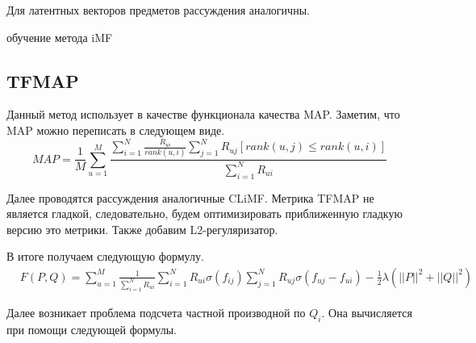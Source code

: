 \documentclass[14pt]{extarticle}
\begin{document}
Для латентных векторов предметов рассуждения аналогичны.

\begin{algorithm}[h]
\caption{обучение метода iMF}
\begin{algorithmic}[1]
\Repeat {} 
	\EndFor
	\EndFor
{}

\end{algorithmic}
\label{alg:climf}
\end{algorithm}


%

\subsection{TFMAP}
Данный метод использует в качестве функционала качества MAP. Заметим, что MAP можно переписать в следующем виде. 
\begin{equation*}
 MAP = \frac{1}{M}\sum_{u=1}^M\frac{\sum_{i=1}^N \frac{R_{ui}}{rank(u, i)} \sum_{j=1}^N R_{uj} 
 [rank(u,j) \leq rank(u, i)]}{\sum_{i=1}^N R_{ui}} 
\end{equation*} 
 
 Далее проводятся рассуждения аналогичные CLiMF. Метрика TFMAP  не является гладкой, следовательно, будем оптимизировать приближенную гладкую версию это метрики. Также добавим L2-регуляризатор.
 
 В итоге получаем  следующую формулу.
 \begin{equation*}
 \begin{split}
 & F(P, Q) = \sum_{u=1}^M \frac{1}{\sum_{i=1}^N R_{ui}} \sum_{i=1}^N R_{ui} \sigma(f_{ij})  \sum_{j=1}^N R_{uj} \sigma(f_{uj} - f_{ui}) - \frac{1}{2}\lambda({||P||}^2 + {||Q||}^2)
 \end{split}
 \end{equation*}

Далее возникает проблема подсчета частной производной по $Q_i$. Она вычисляется при помощи следующей формулы. 
\end{document}
